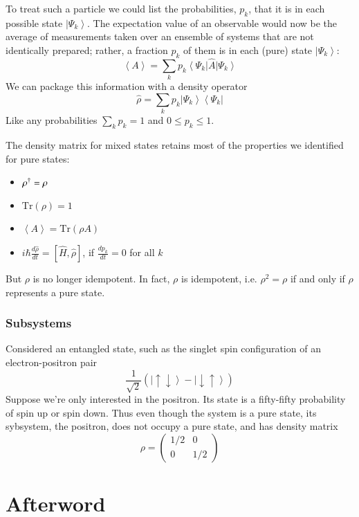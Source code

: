 \documentclass[12pt, a4paper, oneside, openright, titlepage]{book}
\newcommand{\bra}[1]{\left\langle#1\right\vert}
\newcommand{\ket}[1]{\left\vert#1\right\rangle}
\newcommand{\brkt}[1]{\left\langle #1\right\rangle}
\begin{document}
To treat such a particle we could list the probabilities, $p_k$, that it is in each possible state $\ket{\Psi_k}$. The expectation value of an observable would now be the average of measurements taken over an ensemble of systems that are not identically prepared; rather, a fraction $p_k$ of them is in each (pure) state $\ket{\Psi_k}$: $$\brkt{A} = \sum_kp_k\bra{\Psi_k}\hat{A}\ket{\Psi_k}$$
We can package this information with a density operator $$\hat{\rho} = \sum_kp_k\ket{\Psi_k}\bra{\Psi_k}$$
Like any probabilities $\sum_k p_k = 1$ and $0 \leq p_k \leq 1$.
\begin{rmk}
    The density matrix for mixed states retains most of the properties we identified for pure states:\begin{itemize}
        \item $\rho^{\text{\textdagger}} = \rho$
        \item $\text{Tr}(\rho) = 1$
        \item $\brkt{A} = \text{Tr}(\rho A)$
        \item $i\hbar\frac{d\hat{\rho}}{dt} = \left[\hat{H},\hat{\rho}\right]$, if $\frac{dp_k}{dt} = 0$ for all $k$
    \end{itemize}
    But $\rho$ is no longer idempotent. In fact, $\rho$ is idempotent, i.e. $\rho^2 = \rho$ if and only if $\rho$ represents a pure state.
\end{rmk}

\subsection{Subsystems}
 Considered an entangled state, such as the singlet spin configuration of an electron-positron pair $$\frac{1}{\sqrt{2}}(\ket{\uparrow\downarrow}-\ket{\downarrow\uparrow})$$
 Suppose we're only interested in the positron. Its state is a fifty-fifty probability of spin up or spin down. Thus even though the system is a pure state, its sybsystem, the positron, does not occupy a pure state, and has density matrix $$\rho = \begin{pmatrix} 1/2 & 0 \\ 0 & 1/2 \end{pmatrix}$$





\chapter{Afterword}



\begin{appendices}


\end{appendices}
\end{document}
